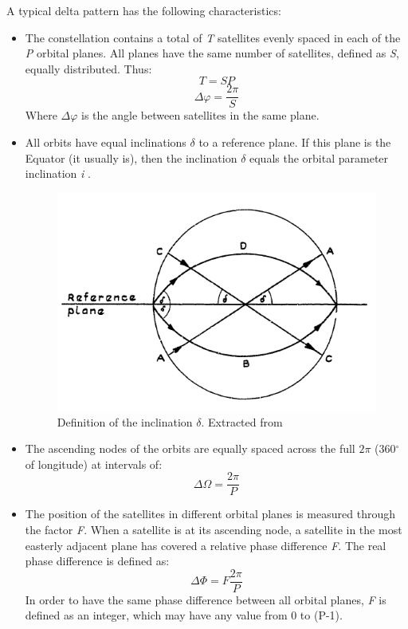 A typical delta pattern has the following characteristics:

\begin{itemize}

\item The constellation contains a total of \textit{T} satellites evenly spaced in each of the \textit{P} orbital planes. All planes have the same number of satellites, defined as \textit{S}, equally distributed. Thus:
\begin{equation}
T = SP
\end{equation}
\begin{equation}
\Delta\varphi=\frac{2\pi}{S}
\end{equation}
Where $\Delta\varphi$ is the angle between satellites in the same plane.

\item All orbits have equal inclinations $\delta$ to a reference plane. If this plane is the Equator (it usually is), then the inclination $\delta$ equals the orbital parameter inclination \textit{i} \cite{Walker1971}.
\begin{figure}[h!]
\centerline{\includegraphics[scale=0.45]{Full/Deltapattern.png}}
\caption{Definition of the inclination $\delta$. Extracted from \cite{Walker1971}}
\label{fig:delta pattern}
\end{figure} 

\item The ascending nodes of the orbits are equally spaced across the full $2\pi$ (360$^{\circ}$ of longitude) at intervals of:
\begin{equation}
\Delta\Omega=\frac{2\pi}{P}
\end{equation}

\item The position of the satellites in different orbital planes is measured through the factor \textit{F}. When a satellite is at its ascending node, a satellite in the most easterly adjacent plane has covered a relative phase difference \textit{F}. The real phase difference is defined as:
\begin{equation}
\Delta\Phi=F\frac{2\pi}{P}
\end{equation}
In order to have the same phase difference between all orbital planes, \textit{F} is defined as an integer, which may have any value from 0 to (P-1).

\end{itemize}

